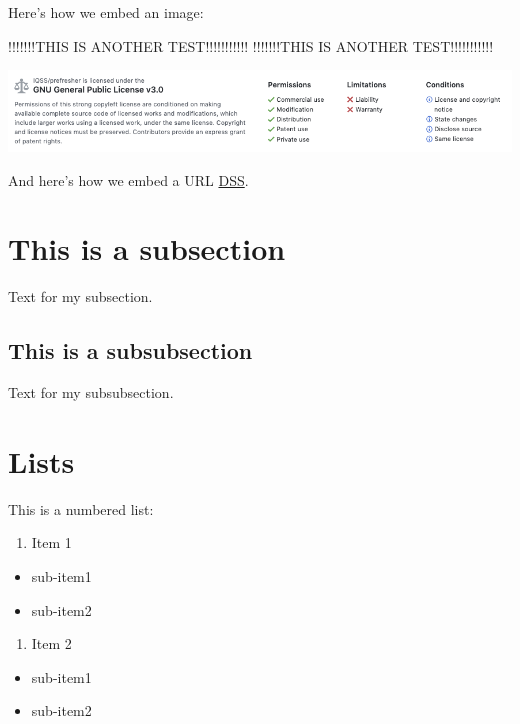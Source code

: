 \documentclass[]{book}
\providecommand{\tightlist}{%
  \setlength{\itemsep}{0pt}\setlength{\parskip}{0pt}}
\begin{document}
Here's how we embed an image:

!!!!!!!THIS IS ANOTHER TEST!!!!!!!!!!!
!!!!!!!THIS IS ANOTHER TEST!!!!!!!!!!!

\includegraphics{images/readme-license.png}

And here's how we embed a URL \href{https://dss.iq.harvard.edu/}{DSS}.

\hypertarget{this-is-a-subsection}{%
\section{This is a subsection}\label{this-is-a-subsection}}

Text for my subsection.

\hypertarget{this-is-a-subsubsection}{%
\subsection{This is a subsubsection}\label{this-is-a-subsubsection}}

Text for my subsubsection.

\hypertarget{lists}{%
\section{Lists}\label{lists}}

This is a numbered list:

\begin{enumerate}
\def\labelenumi{\arabic{enumi}.}
\tightlist
\item
  Item 1
\end{enumerate}

\begin{itemize}
\tightlist
\item
  sub-item1
\item
  sub-item2
\end{itemize}

\begin{enumerate}
\def\labelenumi{\arabic{enumi}.}
\setcounter{enumi}{1}
\tightlist
\item
  Item 2
\end{enumerate}

\begin{itemize}
\tightlist
\item
  sub-item1
\item
  sub-item2
\end{itemize}
\end{document}
